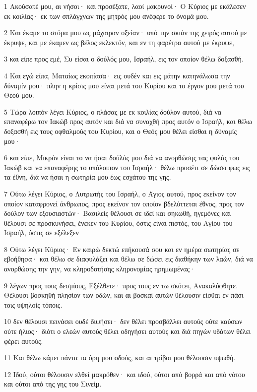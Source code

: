 \par 1 Ακούσατέ μου, αι νήσοι· και προσέξατε, λαοί μακρυνοί· Ο Κύριος με εκάλεσεν εκ κοιλίας· εκ των σπλάγχνων της μητρός μου ανέφερε το όνομά μου.
\par 2 Και έκαμε το στόμα μου ως μάχαιραν οξείαν· υπό την σκιάν της χειρός αυτού με έκρυψε, και με έκαμεν ως βέλος εκλεκτόν, και εν τη φαρέτρα αυτού με έκρυψε,
\par 3 και είπε προς εμέ, Συ είσαι ο δούλός μου, Ισραήλ, εις τον οποίον θέλω δοξασθή.
\par 4 Και εγώ είπα, Ματαίως εκοπίασα· εις ουδέν και εις μάτην κατηνάλωσα την δύναμίν μου· πλην η κρίσις μου είναι μετά του Κυρίου και το έργον μου μετά του Θεού μου.
\par 5 Τώρα λοιπόν λέγει Κύριος, ο πλάσας με εκ κοιλίας δούλον αυτού, διά να επαναφέρω τον Ιακώβ προς αυτόν και διά να συναχθή προς αυτόν ο Ισραήλ, και θέλω δοξασθή εις τους οφθαλμούς του Κυρίου, και ο Θεός μου θέλει είσθαι η δύναμίς μου·
\par 6 και είπε, Μικρόν είναι το να ήσαι δούλός μου διά να ανορθώσης τας φυλάς του Ιακώβ και να επαναφέρης το υπόλοιπον του Ισραήλ· θέλω προσέτι σε δώσει φως εις τα έθνη, διά να ήσαι η σωτηρία μου έως εσχάτου της γης.
\par 7 Ούτω λέγει Κύριος, ο Λυτρωτής του Ισραήλ, ο Άγιος αυτού, προς εκείνον τον οποίον καταφρονεί άνθρωπος, προς εκείνον τον οποίον βδελύττεται έθνος, προς τον δούλον των εξουσιαστών· Βασιλείς θέλουσι σε ιδεί και σηκωθή, ηγεμόνες και θέλουσι σε προσκυνήσει, ένεκεν του Κυρίου, όστις είναι πιστός, του Αγίου του Ισραήλ, όστις σε εξέλεξεν
\par 8 Ούτω λέγει Κύριος· Εν καιρώ δεκτώ επήκουσά σου και εν ημέρα σωτηρίας σε εβοήθησα· και θέλω σε διαφυλάξει και θέλω σε δώσει εις διαθήκην των λαών, διά να ανορθώσης την γην, να κληροδοτήσης κληρονομίας ηρημωμένας·
\par 9 λέγων προς τους δεσμίους, Εξέλθετε· προς τους εν τω σκότει, Ανακαλύφθητε. Θέλουσι βοσκηθή πλησίον των οδών, και αι βοσκαί αυτών θέλουσιν είσθαι εν πάσι τοις υψηλοίς τόποις.
\par 10 δεν θέλουσι πεινάσει ουδέ διψήσει· δεν θέλει προσβάλλει αυτούς ούτε καύσων ούτε ήλιος· διότι ο ελεών αυτούς θέλει οδηγήσει αυτούς και διά πηγών υδάτων θέλει φέρει αυτούς.
\par 11 Και θέλω κάμει πάντα τα όρη μου οδούς, και αι τρίβοι μου θέλουσιν υψωθή.
\par 12 Ιδού, ούτοι θέλουσιν ελθεί μακρόθεν· και ιδού, ούτοι από βορρά και από νότου και ούτοι από της γης του Σινείμ.
